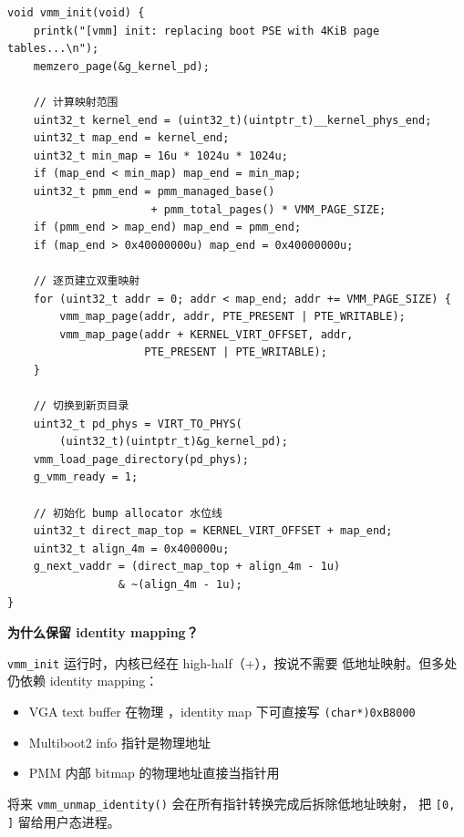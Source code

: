 \begin{lstlisting}[style=cstyle]
void vmm_init(void) {
    printk("[vmm] init: replacing boot PSE with 4KiB page tables...\n");
    memzero_page(&g_kernel_pd);

    // 计算映射范围
    uint32_t kernel_end = (uint32_t)(uintptr_t)__kernel_phys_end;
    uint32_t map_end = kernel_end;
    uint32_t min_map = 16u * 1024u * 1024u;
    if (map_end < min_map) map_end = min_map;
    uint32_t pmm_end = pmm_managed_base()
                      + pmm_total_pages() * VMM_PAGE_SIZE;
    if (pmm_end > map_end) map_end = pmm_end;
    if (map_end > 0x40000000u) map_end = 0x40000000u;

    // 逐页建立双重映射
    for (uint32_t addr = 0; addr < map_end; addr += VMM_PAGE_SIZE) {
        vmm_map_page(addr, addr, PTE_PRESENT | PTE_WRITABLE);
        vmm_map_page(addr + KERNEL_VIRT_OFFSET, addr,
                     PTE_PRESENT | PTE_WRITABLE);
    }

    // 切换到新页目录
    uint32_t pd_phys = VIRT_TO_PHYS(
        (uint32_t)(uintptr_t)&g_kernel_pd);
    vmm_load_page_directory(pd_phys);
    g_vmm_ready = 1;

    // 初始化 bump allocator 水位线
    uint32_t direct_map_top = KERNEL_VIRT_OFFSET + map_end;
    uint32_t align_4m = 0x400000u;
    g_next_vaddr = (direct_map_top + align_4m - 1u)
                 & ~(align_4m - 1u);
}
\end{lstlisting}

\begin{designbox}
\textbf{为什么保留 identity mapping？}

\texttt{vmm\_init} 运行时，内核已经在 high-half（+），按说不需要
低地址映射。但多处仍依赖 identity mapping：
\begin{itemize}
  \item VGA text buffer 在物理 ，identity map 下可直接写 \texttt{(char*)0xB8000}
  \item Multiboot2 info 指针是物理地址
  \item PMM 内部 bitmap 的物理地址直接当指针用
\end{itemize}
将来 \texttt{vmm\_unmap\_identity()} 会在所有指针转换完成后拆除低地址映射，
把 \texttt{[0, ]} 留给用户态进程。
\end{designbox}


